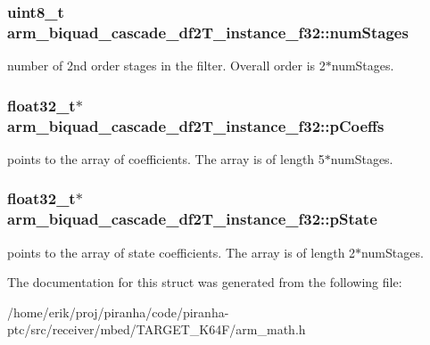 \subsubsection[{\texorpdfstring{num\+Stages}{numStages}}]{\setlength{\rightskip}{0pt plus 5cm}uint8\+\_\+t arm\+\_\+biquad\+\_\+cascade\+\_\+df2\+T\+\_\+instance\+\_\+f32\+::num\+Stages}\hypertarget{structarm__biquad__cascade__df2T__instance__f32_a4d17958c33c3d0a905f974bac50f033f}{}\label{structarm__biquad__cascade__df2T__instance__f32_a4d17958c33c3d0a905f974bac50f033f}
number of 2nd order stages in the filter. Overall order is 2$\ast$num\+Stages. 
\subsubsection[{\texorpdfstring{p\+Coeffs}{pCoeffs}}]{\setlength{\rightskip}{0pt plus 5cm}float32\+\_\+t$\ast$ arm\+\_\+biquad\+\_\+cascade\+\_\+df2\+T\+\_\+instance\+\_\+f32\+::p\+Coeffs}\hypertarget{structarm__biquad__cascade__df2T__instance__f32_a49a24fe1b6ad3b0b26779c32d8d80b2e}{}\label{structarm__biquad__cascade__df2T__instance__f32_a49a24fe1b6ad3b0b26779c32d8d80b2e}
points to the array of coefficients. The array is of length 5$\ast$num\+Stages. 
\subsubsection[{\texorpdfstring{p\+State}{pState}}]{\setlength{\rightskip}{0pt plus 5cm}float32\+\_\+t$\ast$ arm\+\_\+biquad\+\_\+cascade\+\_\+df2\+T\+\_\+instance\+\_\+f32\+::p\+State}\hypertarget{structarm__biquad__cascade__df2T__instance__f32_a24d223addfd926a7177088cf2efe76b1}{}\label{structarm__biquad__cascade__df2T__instance__f32_a24d223addfd926a7177088cf2efe76b1}
points to the array of state coefficients. The array is of length 2$\ast$num\+Stages. 

The documentation for this struct was generated from the following file\+:\begin{DoxyCompactItemize}
\item 
/home/erik/proj/piranha/code/piranha-\/ptc/src/receiver/mbed/\+T\+A\+R\+G\+E\+T\+\_\+\+K64\+F/arm\+\_\+math.\+h\end{DoxyCompactItemize}

